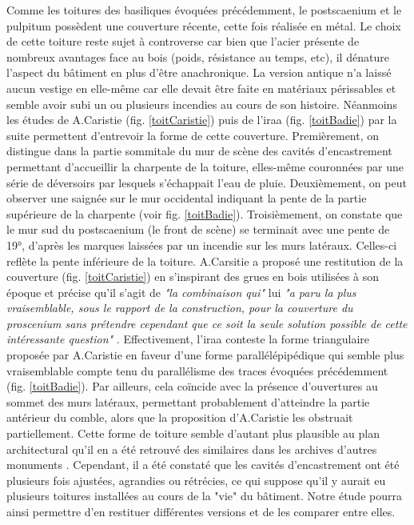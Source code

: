		Comme les toitures des \glspl{basilique} évoquées précédemment, le \gls{postscaenium} et le \gls{pulpitum} possèdent une couverture récente, cette fois réalisée en métal. Le choix de cette toiture reste sujet à controverse car bien que l'acier présente de nombreux avantages face au bois (poids, résistance au temps, etc), il dénature l'aspect du bâtiment en plus d'être anachronique. La version antique n'a laissé aucun vestige en elle-même car elle devait être faite en matériaux périssables et semble avoir subi un ou plusieurs incendies au cours de son histoire. Néanmoins les études de A.Caristie (fig. \ref{toitCaristie}) puis de l'\gls{iraa} (fig. \ref{toitBadie}) par la suite permettent d'entrevoir la forme de cette couverture. Premièrement, on distingue dans la partie sommitale du mur de scène des cavités d'encastrement permettant d'accueillir la charpente de la toiture, elles-même couronnées par une série de déversoirs par lesquels s’échappait l’eau de pluie. Deuxièmement, on peut observer une saignée sur le mur occidental indiquant la pente de la partie supérieure de la charpente (voir fig. \ref{toitBadie}). Troisièmement, on constate que le mur sud du \gls{postscaenium} (le front de scène) se terminait avec une pente de 19°, d'après les marques laissées par un incendie sur les murs latéraux. Celles-ci reflète la pente inférieure de la toiture. A.Carsitie a proposé une restitution de la couverture (fig. \ref{toitCaristie}) en s'inspirant des grues en bois utilisées à son époque et précise qu'il s'agit de \textit{"la combinaison qui"} lui \textit{"a paru la plus vraisemblable, sous le rapport de la construction, pour la couverture du proscenium sans prétendre cependant que ce soit la seule solution possible de cette intéressante question"} \cite[p. 31]{orangeTxt}. Effectivement, l'\gls{iraa} \cite[p. 32]{orangeTxt} conteste la forme triangulaire proposée par A.Caristie en faveur d'une forme parallélépipédique qui semble plus vraisemblable compte tenu du parallélisme des traces évoquées précédemment (fig. \ref{toitBadie}). Par ailleurs, cela coïncide avec la présence d'ouvertures au sommet des murs latéraux, permettant probablement d'atteindre la partie antérieur du comble, alors que la proposition d'A.Caristie les obstruait partiellement. Cette forme de toiture semble d'autant plus plausible au plan architectural qu'il en a été retrouvé des similaires dans les archives d'autres monuments \cite[fig. 27]{orangeTxt}. Cependant, il a été constaté que les cavités d'encastrement ont été plusieurs fois ajustées, agrandies ou rétrécies, ce qui suppose qu'il y aurait eu plusieurs toitures installées au cours de la "vie" du bâtiment. Notre étude pourra ainsi permettre d'en restituer différentes versions et de les comparer entre elles.
		
